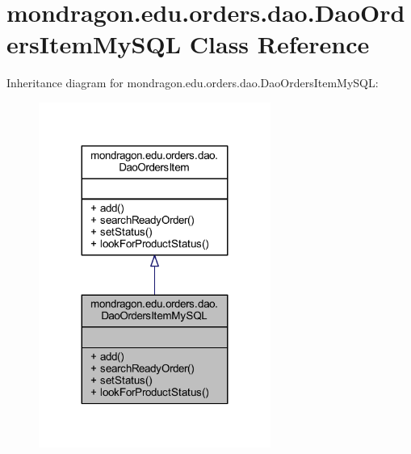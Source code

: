 \hypertarget{classmondragon_1_1edu_1_1orders_1_1dao_1_1_dao_orders_item_my_s_q_l}{}\section{mondragon.\+edu.\+orders.\+dao.\+Dao\+Orders\+Item\+My\+S\+QL Class Reference}
\label{classmondragon_1_1edu_1_1orders_1_1dao_1_1_dao_orders_item_my_s_q_l}


Inheritance diagram for mondragon.\+edu.\+orders.\+dao.\+Dao\+Orders\+Item\+My\+S\+QL\+:\nopagebreak
\begin{figure}[H]
\begin{center}
\leavevmode
\includegraphics[width=215pt]{classmondragon_1_1edu_1_1orders_1_1dao_1_1_dao_orders_item_my_s_q_l__inherit__graph}
\end{center}
\end{figure}


